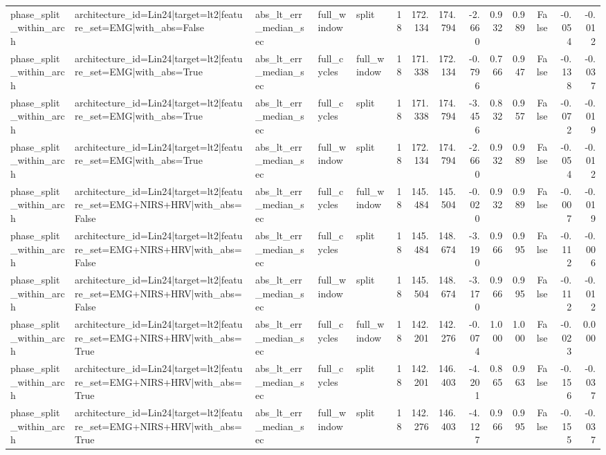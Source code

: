 \begin{table}
\begin{tabular}{lllllrrrrrrrrr}
phase_split_within_arch & architecture_id=Lin24|target=lt2|feature_set=EMG|with_abs=False & abs_lt_err_median_sec & full_window & split & 18 & 172.134 & 174.794 & -2.660 & 0.932 & 0.989 & False & -0.054 & -0.012 \\
phase_split_within_arch & architecture_id=Lin24|target=lt2|feature_set=EMG|with_abs=True & abs_lt_err_median_sec & full_cycles & full_window & 18 & 171.338 & 172.134 & -0.796 & 0.766 & 0.947 & False & -0.138 & -0.037 \\
phase_split_within_arch & architecture_id=Lin24|target=lt2|feature_set=EMG|with_abs=True & abs_lt_err_median_sec & full_cycles & split & 18 & 171.338 & 174.794 & -3.456 & 0.832 & 0.957 & False & -0.072 & -0.019 \\
phase_split_within_arch & architecture_id=Lin24|target=lt2|feature_set=EMG|with_abs=True & abs_lt_err_median_sec & full_window & split & 18 & 172.134 & 174.794 & -2.660 & 0.932 & 0.989 & False & -0.054 & -0.012 \\
phase_split_within_arch & architecture_id=Lin24|target=lt2|feature_set=EMG+NIRS+HRV|with_abs=False & abs_lt_err_median_sec & full_cycles & full_window & 18 & 145.484 & 145.504 & -0.020 & 0.932 & 0.989 & False & -0.007 & -0.019 \\
phase_split_within_arch & architecture_id=Lin24|target=lt2|feature_set=EMG+NIRS+HRV|with_abs=False & abs_lt_err_median_sec & full_cycles & split & 18 & 145.484 & 148.674 & -3.190 & 0.966 & 0.995 & False & -0.112 & -0.006 \\
phase_split_within_arch & architecture_id=Lin24|target=lt2|feature_set=EMG+NIRS+HRV|with_abs=False & abs_lt_err_median_sec & full_window & split & 18 & 145.504 & 148.674 & -3.170 & 0.966 & 0.995 & False & -0.112 & -0.012 \\
phase_split_within_arch & architecture_id=Lin24|target=lt2|feature_set=EMG+NIRS+HRV|with_abs=True & abs_lt_err_median_sec & full_cycles & full_window & 18 & 142.201 & 142.276 & -0.074 & 1.000 & 1.000 & False & -0.023 & 0.000 \\
phase_split_within_arch & architecture_id=Lin24|target=lt2|feature_set=EMG+NIRS+HRV|with_abs=True & abs_lt_err_median_sec & full_cycles & split & 18 & 142.201 & 146.403 & -4.201 & 0.865 & 0.963 & False & -0.156 & -0.037 \\
phase_split_within_arch & architecture_id=Lin24|target=lt2|feature_set=EMG+NIRS+HRV|with_abs=True & abs_lt_err_median_sec & full_window & split & 18 & 142.276 & 146.403 & -4.127 & 0.966 & 0.995 & False & -0.155 & -0.037 \\

\end{tabular}
\end{table}
